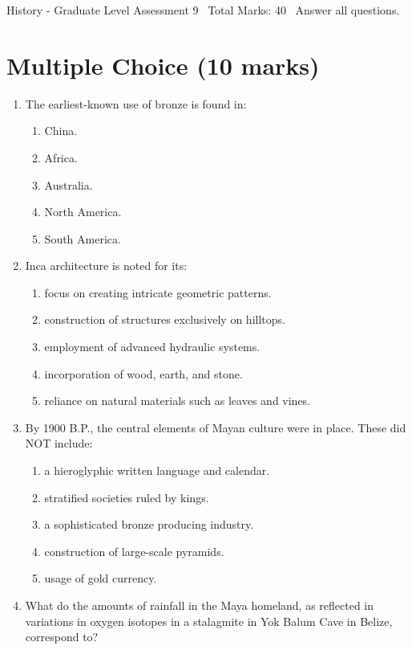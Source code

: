 \documentclass[12pt]{article}
\begin{document}
\begin{center}
History - Graduate Level Assessment 9 \
Total Marks: 40 \
Answer all questions.
\end{center}

\section*{Multiple Choice (10 marks)}
\begin{enumerate}[label=\arabic*.]
\item The earliest-known use of bronze is found in:
\begin{enumerate}[label=(\alph*)]
    \item China.
    \item Africa.
    \item Australia.
    \item North America.
    \item South America.
\end{enumerate}
\item Inca architecture is noted for its:
\begin{enumerate}[label=(\alph*)]
    \item focus on creating intricate geometric patterns.
    \item construction of structures exclusively on hilltops.
    \item employment of advanced hydraulic systems.
    \item incorporation of wood, earth, and stone.
    \item reliance on natural materials such as leaves and vines.
\end{enumerate}
\item By 1900 B.P., the central elements of Mayan culture were in place. These did NOT include:
\begin{enumerate}[label=(\alph*)]
    \item a hieroglyphic written language and calendar.
    \item stratified societies ruled by kings.
    \item a sophisticated bronze producing industry.
    \item construction of large-scale pyramids.
    \item usage of gold currency.
\end{enumerate}
\item What do the amounts of rainfall in the Maya homeland, as reflected in variations in oxygen isotopes in a stalagmite in Yok Balum Cave in Belize, correspond to?

\end{enumerate}
\end{document}
